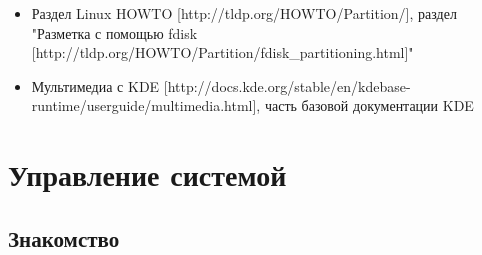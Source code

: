 \documentclass[10pt]{book}
\begin{document}
\phantom{}
\begin{tcolorbox}[title=\textbf{Дальнейшие ресурсы}, colback=yellow!14!white, colframe=red!75!blue]
\begin{itemize}
\item Раздел Linux HOWTO [http://tldp.org/HOWTO/Partition/], раздел "Разметка с помощью fdisk [http://tldp.org/HOWTO/Partition/fdisk\_partitioning.html]"
\item Мультимедиа с KDE [http://docs.kde.org/stable/en/kdebase-runtime/userguide/multimedia.html], часть базовой документации KDE
\end{itemize}
\end{tcolorbox}

\newpage


\chapter{Управление системой}

\section{Знакомство}
\end{document}
